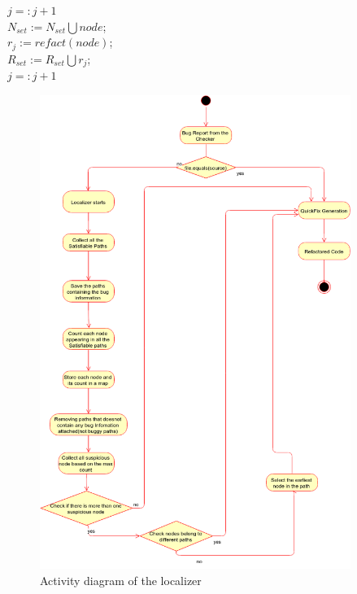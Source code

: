 {\begin{algorithm}[ht]
{{{$j=:j+1$\;
}{\textcolor{dkgreen}{\textbf{\selectfont{//if nodes belong to different paths create refactoring for each node
in different paths}}}\\
$N_{set}:=N_{set}\bigcup{node}$;\textcolor{dkgreen}{\textbf{\selectfont{//adding node to node set}}}\\
$r_{j}:= refact(node)$;\textcolor{dkgreen}{\textbf{\selectfont{//Refactoring the node}}}\\
$R_{set}:=R_{set}\bigcup{r_{j}}$;\textcolor{dkgreen}{\textbf{\selectfont{//adding refactored node}}}\\
$j=:j+1$\;
}
}
}
\end{algorithm}
}

\begin{figure}[!htb]
\centering
\includegraphics[width=0.9\textwidth]{png/localizer.png}
\caption{Activity diagram of the localizer}
\label{fig:localizer}
\end{figure}


